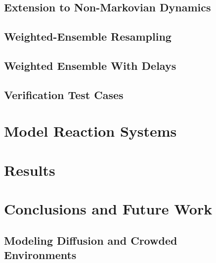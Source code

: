 \documentclass[english,letterpaper,12pt]{article}
\begin{document}
\begin{doublespacing}
\subsection{Extension to Non-Markovian Dynamics} %
\label{sub:non-markovian}



\subsection{Weighted-Ensemble Resampling} %
\label{sub:we-resampling-intro}


\subsection{Weighted Ensemble With Delays} %
\label{sub:we-delays}


\subsection{Verification Test Cases} %
\label{sub:verification}





\section{Model Reaction Systems} %
\label{sec:model-systems}

\section{Results} %
\label{sec:results}

\section{Conclusions and Future Work} %
\label{sec:conclusions}

\subsection{Modeling Diffusion and Crowded Environments} %
\label{sub:diffusion-crowded}




\end{doublespacing}
\end{document}
